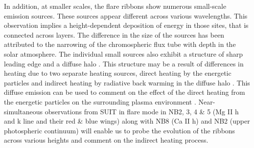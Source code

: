 \documentclass{article}
\begin{document}
In addition, at smaller scales, the flare ribbons show numerous small-scale emission sources. These sources appear different across various wavelengths. This observation implies a height-dependent deposition of energy in those sites, that is connected across layers. The difference in the size of the sources has been attributed to the narrowing of the chromospheric flux tube with depth in the solar atmosphere\citep{xu12, jing16, sharykin14}. The individual small sources also exhibit a structure of sharp leading edge and a diffuse halo \citep{neidig93, hudson06, xu06, isobe07}. This structure may be a result of differences in heating due to two separate heating sources, direct heating by the energetic particles and indirect heating by radiative back warming in the diffuse halo \citep{machado89, neidig93, xu06}. This diffuse emission can be used to comment on the effect of the direct heating from the energetic particles on the surrounding plasma environment \citep{ashfield22, mulay23}. Near-simultaneous observations from SUIT in flare mode in NB2, 3, 4 \& 5 (Mg II h and k line and their red \& blue wings)  along with NB8 (Ca II h) and NB2 (upper photospheric continuum) will enable us to probe the evolution of the ribbons across various heights and comment on the indirect heating process.

\vspace{0.2in}



{}

\end{document}
